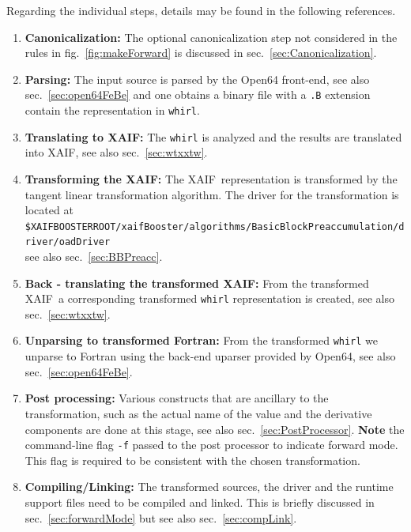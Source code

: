\documentclass{book}
\newcommand{\xaif}{XAIF}
\newcommand{\refsec}[1]{{sec.~\ref{#1}}}
\newcommand{\reffig}[1]{{fig.~\ref{#1}}}
\begin{document}
Regarding the individual steps, details may be found in the following references.
\begin{enumerate}
\item {\bf Canonicalization:} The optional canonicalization step not considered in the rules in \reffig{fig:makeForward} is discussed in \refsec{sec:Canonicalization}.
\item {\bf Parsing:} The input source is parsed by the Open64 front-end, see also \refsec{sec:open64FeBe} and 
one obtains a binary file with a \lstinline{.B} extension contain the representation in \lstinline{whirl}.
\item {\bf Translating to XAIF:} The \lstinline{whirl} is analyzed and the results are 
translated into \xaif, see also \refsec{sec:wtxxtw}.
\item {\bf Transforming the XAIF:} The \xaif\ representation is transformed by 
the tangent linear transformation algorithm. The driver for the transformation is located at \\[1ex]
\hspace*{.3cm}\lstinline{$XAIFBOOSTERROOT/xaifBooster/algorithms/BasicBlockPreaccumulation/driver/oadDriver} \\[1ex]%
see also \refsec{sec:BBPreacc}.
\item {\bf Back - translating the transformed XAIF:} From the transformed \xaif\ a corresponding transformed \lstinline{whirl} 
representation is created, see also \refsec{sec:wtxxtw}. 
\item {\bf Unparsing to transformed Fortran:} From the transformed \lstinline{whirl} we unparse 
to Fortran using the back-end uparser provided by Open64, see also \refsec{sec:open64FeBe}. 
\item {\bf Post processing:} Various constructs that are ancillary to the transformation, 
such as the actual name of the value and the derivative components are done at this stage, 
see also \refsec{sec:PostProcessor}. 
{\bf Note} the command-line flag \lstinline{-f} passed to the post processor to indicate forward mode. 
This flag is required to be consistent with the chosen transformation.
\item {\bf Compiling/Linking:} The transformed sources, the driver and the runtime support files need to be compiled and linked. This is briefly discussed in \refsec{sec:forwardMode} but see also \refsec{sec:compLink}.
\end{enumerate}

\end{document}
